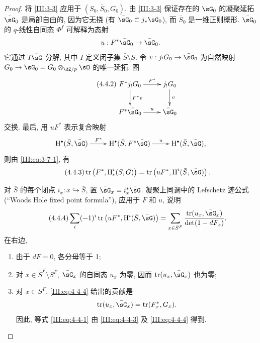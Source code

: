 \begin{proof}
将 \ref{III:3-3} 应用于 $(S_0,\bar S_0,G_0)$. 由 \ref{III:3-3} 保证存在的 $\sG_0$ 的凝聚延拓 $\bar\sG_0$ 是局部自由的, 因为它无挠 (有 $\bar\sG_0\subset j_*\sG_0$), 而 $\bar S_0$ 是一维正则概形. $\bar\sG_0$ 的 $q$-线性自同态 $\Phi^f$ 可解释为态射
\[
  u : F^*\bar\sG_0 \to \bar\sG_0 \text{.}
\]
它通过 $I\bar\sG$ 分解, 其中 $I$ 定义闭子集 $\bar S\setminus S$. 令 $v:j_!G_0 \to \bar\sG_0$ 为自然映射 $G_0 \to \sG_0 = G_0\otimes_{\dZ/p}\sO$ 的唯一延拓. 图
\begin{equation*}\tag{4.4.2}\label{III:eq:4-4-2}
\xymatrix{
  F^* j_! G_0 \ar[r]^-{F^*} \ar[d]^-{F^* v}
    & j_! G_0 \ar[d]^-v \\
  F^*\bar \sG_0 \ar[r]^-u
    & \bar\sG_0
}
\end{equation*}
交换.
最后, 用 $u F^*$ 表示复合映射
\[\xymatrix{
  \h^\bullet(\bar S,\bar\sG) \ar[r]^-{F^*}
    & \h^\bullet(\bar S,F^*\bar\sG) \ar[r]^-u
    & \h^\bullet(\bar S,\bar\sG) \text{,}
}\]
则由 \eqref{III:eq:3-7-1}, 有
\begin{equation*}\tag{4.4.3}\label{III:eq:4-4-3}
  \tr\left(F^*,\h_c^i(S,G)\right) = \tr\left(u F^*,\h^i(\bar S,\bar\sG)\right) \text{.}
\end{equation*}

对 $\bar S$ 的每个闭点 $i_x:x\hookrightarrow \bar S$, 置 $\bar\sG_x = i_x^*\bar\sG$. 凝聚上同调中的 Lefschetz 迹公式 (“Woods Hole fixed point formula”), 应用于 $F$ 和 $u$, 说明
\begin{equation*}\tag{4.4.4}\label{III:eq:4-4-4}
  \sum_i (-1)^i \tr\left(uF^*, \h^i(\bar S,\bar\sG)\right) = \sum_{x\in \bar S^F} \frac{\tr(u_x,\bar\sG_x)}{\det(1-d F_x)} \text{.}
\end{equation*}
在右边,
\begin{enumerate}[\indent a)]
  \item 由于 $d F=0$, 各分母等于 1;
  \item 对 $x\in \bar S^F\setminus S^F$, $\bar\sG_x$ 的自同态 $u_x$ 为零, 因而 $\tr(u_x,\bar\sG_x)$ 也为零;
  \item 对 $x\in S^F$, \eqref{III:eq:4-4-4} 给出的贡献是
    \[
      \tr(u_x,\bar\sG_x) = \tr(F_x^*,G_x) \text{.}
    \]
    因此, 等式 \eqref{III:eq:4-4-1} 由 \eqref{III:eq:4-4-3} 及 \eqref{III:eq:4-4-4} 得到.
\end{enumerate}
\end{proof}

